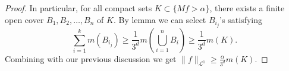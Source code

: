 \begin{proof}[Proof]
	In particular, for all compact sets $K \subset \{Mf>\alpha\}$,
	there exists a finite open cover $B_1,B_2,\dots,B_n$ of $K$.
	By lemma we can select $B_{i_j}$'s satisfying
	\[
		\sum_{i=1}^k m(B_{i_j}) \ge \frac{1}{3^d}m\left(\bigcup_{i=1}^n B_i\right)
		\ge \frac{1}{3^d}m(K).
	\]
	Combining with our previous discussion
	we get $\lVert f \rVert _{\mathcal{L}^1}\ge \frac{\alpha}{3^d}m(K)$.

\end{proof}

